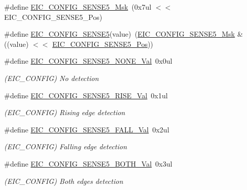\begin{DoxyCompactItemize}
\#define \mbox{\hyperlink{group___s_a_m_d21___e_i_c_ga6091029100aaca65d8ce76d3ab137444}{E\+I\+C\+\_\+\+C\+O\+N\+F\+I\+G\+\_\+\+S\+E\+N\+S\+E5\+\_\+\+Msk}}~(0x7ul $<$$<$ E\+I\+C\+\_\+\+C\+O\+N\+F\+I\+G\+\_\+\+S\+E\+N\+S\+E5\+\_\+\+Pos)
\item 
\#define \mbox{\hyperlink{group___s_a_m_d21___e_i_c_ga13a13ad711a9ca5496c5fca4fbf4ee37}{E\+I\+C\+\_\+\+C\+O\+N\+F\+I\+G\+\_\+\+S\+E\+N\+S\+E5}}(value)~(\mbox{\hyperlink{group___s_a_m_d21___e_i_c_ga6091029100aaca65d8ce76d3ab137444}{E\+I\+C\+\_\+\+C\+O\+N\+F\+I\+G\+\_\+\+S\+E\+N\+S\+E5\+\_\+\+Msk}} \& ((value) $<$$<$ \mbox{\hyperlink{group___s_a_m_d21___e_i_c_gace7caae074bf08e88805b591c626fb7f}{E\+I\+C\+\_\+\+C\+O\+N\+F\+I\+G\+\_\+\+S\+E\+N\+S\+E5\+\_\+\+Pos}}))
\item 
\#define \mbox{\hyperlink{group___s_a_m_d21___e_i_c_ga1f73b11cdad345f444d6267c016e7d06}{E\+I\+C\+\_\+\+C\+O\+N\+F\+I\+G\+\_\+\+S\+E\+N\+S\+E5\+\_\+\+N\+O\+N\+E\+\_\+\+Val}}~0x0ul
\begin{DoxyCompactList}\small\item\em (E\+I\+C\+\_\+\+C\+O\+N\+F\+IG) No detection \end{DoxyCompactList}\item 
\#define \mbox{\hyperlink{group___s_a_m_d21___e_i_c_gaa79135e0c433132db7b3df88472fda74}{E\+I\+C\+\_\+\+C\+O\+N\+F\+I\+G\+\_\+\+S\+E\+N\+S\+E5\+\_\+\+R\+I\+S\+E\+\_\+\+Val}}~0x1ul
\begin{DoxyCompactList}\small\item\em (E\+I\+C\+\_\+\+C\+O\+N\+F\+IG) Rising edge detection \end{DoxyCompactList}\item 
\#define \mbox{\hyperlink{group___s_a_m_d21___e_i_c_ga2f575e054321eef78315a123006b62dc}{E\+I\+C\+\_\+\+C\+O\+N\+F\+I\+G\+\_\+\+S\+E\+N\+S\+E5\+\_\+\+F\+A\+L\+L\+\_\+\+Val}}~0x2ul
\begin{DoxyCompactList}\small\item\em (E\+I\+C\+\_\+\+C\+O\+N\+F\+IG) Falling edge detection \end{DoxyCompactList}\item 
\#define \mbox{\hyperlink{group___s_a_m_d21___e_i_c_ga020047d3418afa7b60b72bfc4872bfb0}{E\+I\+C\+\_\+\+C\+O\+N\+F\+I\+G\+\_\+\+S\+E\+N\+S\+E5\+\_\+\+B\+O\+T\+H\+\_\+\+Val}}~0x3ul
\begin{DoxyCompactList}\small\item\em (E\+I\+C\+\_\+\+C\+O\+N\+F\+IG) Both edges detection \end{DoxyCompactList}\item 

\end{DoxyCompactItemize}
